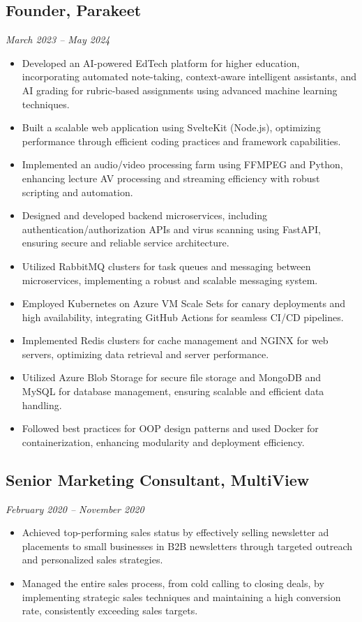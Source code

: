 \documentclass[a4paper,10pt]{article}
\begin{document}
\subsection*{Founder, Parakeet}
\textit{March 2023 -- May 2024}
\begin{itemize}
    \item Developed an AI-powered EdTech platform for higher education, incorporating automated note-taking, context-aware intelligent assistants, and AI grading for rubric-based assignments using advanced machine learning techniques.
    \item Built a scalable web application using SvelteKit (Node.js), optimizing performance through efficient coding practices and framework capabilities.
    \item Implemented an audio/video processing farm using FFMPEG and Python, enhancing lecture AV processing and streaming efficiency with robust scripting and automation.
    \item Designed and developed backend microservices, including authentication/authorization APIs and virus scanning using FastAPI, ensuring secure and reliable service architecture.
    \item Utilized RabbitMQ clusters for task queues and messaging between microservices, implementing a robust and scalable messaging system.
    \item Employed Kubernetes on Azure VM Scale Sets for canary deployments and high availability, integrating GitHub Actions for seamless CI/CD pipelines.
    \item Implemented Redis clusters for cache management and NGINX for web servers, optimizing data retrieval and server performance.
    \item Utilized Azure Blob Storage for secure file storage and MongoDB and MySQL for database management, ensuring scalable and efficient data handling.
    \item Followed best practices for OOP design patterns and used Docker for containerization, enhancing modularity and deployment efficiency.
\end{itemize}

\subsection*{Senior Marketing Consultant, MultiView}
\textit{February 2020 -- November 2020}
\begin{itemize}
    \item Achieved top-performing sales status by effectively selling newsletter ad placements to small businesses in B2B newsletters through targeted outreach and personalized sales strategies.
    \item Managed the entire sales process, from cold calling to closing deals, by implementing strategic sales techniques and maintaining a high conversion rate, consistently exceeding sales targets.
\end{itemize}
\end{document}
